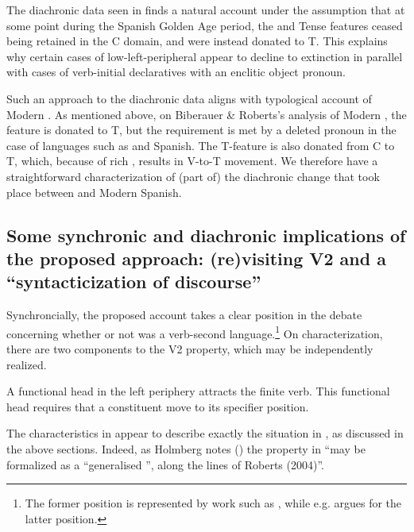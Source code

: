 \documentclass[output=paper]{LSP/langsci}
\begin{document}
The diachronic data seen in  finds a natural account under the assumption that at some point during the Spanish Golden Age period, the  and Tense features ceased being retained in the C domain, and were instead donated to T.  This explains why certain cases of low-left-peripheral  appear to decline to extinction in parallel with cases of verb-initial declaratives with an enclitic object pronoun.  

Such an approach to the diachronic data aligns with  typological account of Modern .  As mentioned above, on Biberauer \& Roberts’s analysis of Modern , the  feature is donated to T, but the requirement is met by a deleted\textbf{} pronoun in the case of  languages such as  and Spanish.  The T-feature is also donated from C to T, which, because of rich , results in V-to-T movement.  We therefore have a straightforward characterization of (part of) the diachronic change that took place between  and Modern Spanish.

\subsection{Some synchronic and diachronic implications of the proposed approach: (re)visiting V2 and a ``syntacticization of discourse''}\label{sec:poole:4.2}
Synchroncially, the proposed account takes a clear position in the debate concerning whether or not  was a verb-second language.\footnote{The former position is represented by work such as \citet{Fontana1993}, while e.g. \citet{Sitaridou2012} argues for the latter position.}  On  characterization, there are two components to the V2 property, which may be independently realized.

\ea%
    \label{ex:poole:27}
     \ea \label{ex:poole:27a} A functional head in the left periphery attracts the finite verb.
     \ex \label{ex:poole:27b} This functional head requires that a constituent move to its specifier position.
\z
\z

\noindent The characteristics in  appear to describe exactly the situation in , as discussed in the above sections.  Indeed, as Holmberg notes (\citeyear[276]{Holmberg2015verbsecond}) the property in  “may be formalized as a ``generalised '', along the lines of Roberts (2004)”.
\end{document}
